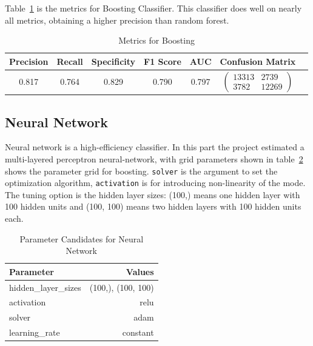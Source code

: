 Table~\ref{tab:boosting} is the metrics for Boosting Classifier. This classifier does well on nearly all metrics, obtaining a higher precision than random forest.

\begin{table}
\centering
\begin{tabular}{|c|c|c|c|c|c|c}
\hline
\textbf{Precision} & \textbf{Recall} & \textbf{Specificity} & \textbf{F1 Score} & \textbf{AUC} & \textbf{Confusion Matrix} \\
\hline
0.817 & 0.764 & 0.829 & 0.790 & 0.797 & $\left(\begin{array}{cc} 13313 & 2739 \\ 3782 & 12269 \end{array}\right)$ \\ 
\hline
\end{tabular}
\caption{Metrics for Boosting}
\label{tab:boosting}
\end{table}

\subsection{Neural Network}

Neural network is a high-efficiency classifier. In this part the project estimated a multi-layered perceptron neural-network, with grid parameters shown in table~\ref{tab:parameters-neural-network} shows the parameter grid for boosting. \texttt{solver} is the argument to set the optimization algorithm, \texttt{activation} is for introducing non-linearity of the mode. The tuning option is the hidden layer sizes: (100,) means one hidden layer with 100 hidden units and (100, 100) means two hidden layers with 100 hidden units each.

\begin{table}[h]
\centering
\begin{tabular}{|l|r|}
\hline
\textbf{Parameter}        & \textbf{Values}                \\ \hline
hidden\_layer\_sizes      & (100,), (100, 100)             \\ \hline
activation                & relu                           \\ \hline
solver                    & adam                           \\ \hline
learning\_rate            & constant                       \\ \hline
\end{tabular}
\caption{Parameter Candidates for Neural Network}
\label{tab:parameters-neural-network}
\end{table}

